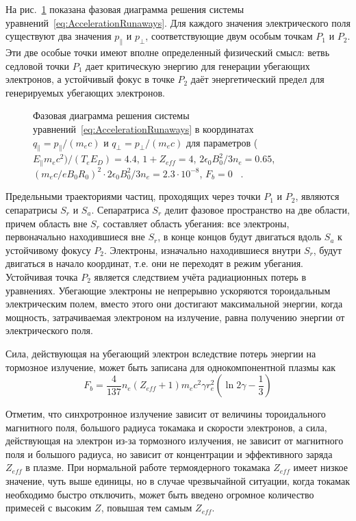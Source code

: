 На рис.~\ref{fig:solisRunawayPhaseDiagram} показана фазовая диаграмма решения системы уравнений~\ref{eq:AccelerationRunaways}. Для каждого значения электрического поля существуют два значения $p_{\parallel}$ и $p_{\perp}$, соответствующие двум особым точкам $P_1$ и $P_2$. Эти две особые точки имеют вполне определенный физический смысл: ветвь седловой точки $P_1$ дает критическую энергию для генерации убегающих электронов, а устойчивый фокус в точке $P_2$ даёт энергетический предел для генерируемых убегающих электронов.

\begin{figure}[ht]
  \caption{ Фазовая диаграмма решения системы уравнений~\ref{eq:AccelerationRunaways} в координатах $q_{\parallel} = p_{\parallel}/(m_e c)$ и $q_{\perp} = p_{\perp}/(m_e c)$ для параметров ( $E_{\parallel} m_e c^2 )/(T_e E_D ) = 4.4$, $ 1 + Z_{eff} = 4 $, $ 2 \epsilon_0 B_0^2 / 3 n_e = 0.65 $, $ ( m_e c / e B_0 R_0 )^2 \cdot 2 \epsilon_0 B_0^2 / 3 n_e = 2.3 \cdot 10^{-8} $, $F_b = 0$ ~\cite{MartinSolis1998}.}
  \label{fig:solisRunawayPhaseDiagram}
\end{figure}

Предельными траекториями частиц, проходящих через точки $P_1$ и $P_2$, являются сепаратрисы $S_r$ и $S_a$. Сепаратриса $S_r$ делит фазовое пространство на две области, причем область вне $S_r$ составляет область убегания: все электроны, первоначально находившиеся вне $S_r$, в конце концов будут двигаться вдоль $S_a$ к устойчивому фокусу $P_2$. Электроны, изначально находившиеся внутри $S_r$, будут двигаться в начало координат, т.е. они не переходят в режим убегания. Устойчивая точка $P_2$ является следствием учёта радиационных потерь в уравнениях. Убегающие электроны не непрерывно ускоряются тороидальным электрическим полем, вместо этого они достигают максимальной энергии, когда мощность, затрачиваемая электроном на излучение, равна получению энергии от электрического поля.  

Сила, действующая на убегающий электрон вследствие потерь энергии на тормозное излучение, может быть записана для однокомпонентной плазмы как~\cite{Bakhtiari2005}
\begin{equation*}
  F_b = \frac{4}{137} n_e ( Z_{eff} + 1 ) m_e c^2 \gamma r_e^2 \left( \ln 2 \gamma - \frac{1}{3} \right)
\end{equation*}

Отметим, что синхротронное излучение зависит от величины тороидального магнитного поля, большого радиуса токамака и скорости электронов, а сила, действующая на электрон из-за тормозного излучения, не зависит от магнитного поля и большого радиуса, но зависит от концентрации и эффективного заряда $Z_{eff}$ в плазме. При нормальной работе термоядерного токамака $Z_{eff}$ имеет низкое значение, чуть выше единицы, но в случае чрезвычайной ситуации, когда токамак необходимо быстро отключить, может быть введено огромное количество примесей с высоким $Z$, повышая тем самым $Z_{eff}$. 

